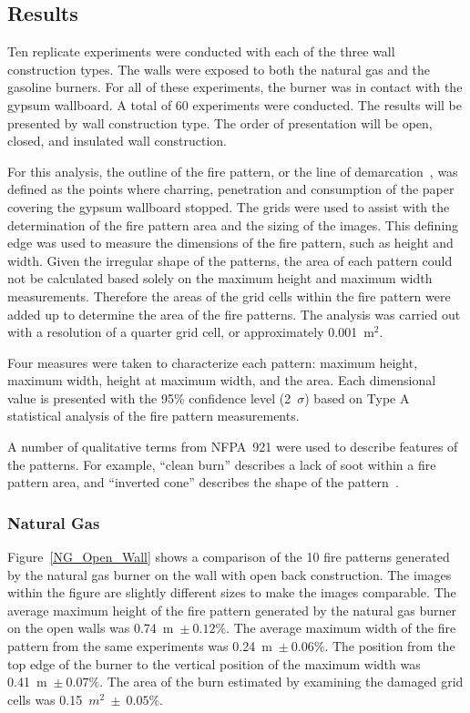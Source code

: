 \documentclass[twoside]{uocthesis}
\begin{document}
{\subsection{Results}

Ten replicate experiments were conducted with each of the three wall construction types.  The walls were exposed to both the natural gas and the gasoline burners.  For all of these experiments, the burner was in contact with the gypsum wallboard.  A total of 60 experiments were conducted.  The results will be presented by wall construction type.  The order of presentation will be open, closed, and insulated wall construction.  

For this analysis, the outline of the fire pattern, or the line of demarcation~\cite{NFPA:921}, was defined as the points where charring, penetration and consumption of the paper covering the gypsum wallboard stopped. The grids were used to assist with the determination of the fire pattern area and the sizing of the images. This defining edge was used to measure the dimensions of the fire pattern, such as height and width. Given the irregular shape of the patterns, the area of each pattern could not be calculated based solely on the maximum height and maximum width measurements. Therefore the areas of the grid cells within the fire pattern were added up to determine the area of the fire patterns.  The analysis was carried out with a resolution of a quarter grid cell, or approximately 0.001~m$^2$. 

Four measures were taken to characterize each pattern: maximum height, maximum width, height at maximum width, and the area.  Each dimensional value is presented with the 95\% confidence level (2~$\sigma$) based on Type A statistical analysis of the fire pattern measurements. 

A number of qualitative terms from NFPA~921 were used to describe features of the patterns.  For example, ``clean burn'' describes a lack of soot within a fire pattern area, and ``inverted cone'' describes the shape of the pattern~\cite{NFPA:921}.      

\subsubsection{Natural Gas}

Figure~\ref{NG_Open_Wall} shows a comparison of the 10 fire patterns generated by the natural gas burner on the wall with open back construction.  The images within the figure are slightly different sizes to make the images comparable.  The average maximum height of the fire pattern generated by the natural gas burner on the open walls was 0.74~m~$\pm~0.12\%$.  The average maximum width of the fire pattern from the same experiments was 0.24~m~$\pm~0.06\%$.  The position from the top edge of the burner to the vertical position of the maximum width was 0.41~m~$\pm~0.07\%$. The area of the burn estimated by examining the damaged grid cells was 0.15~$m^2~\pm~0.05\%$.  

}
\end{document}

